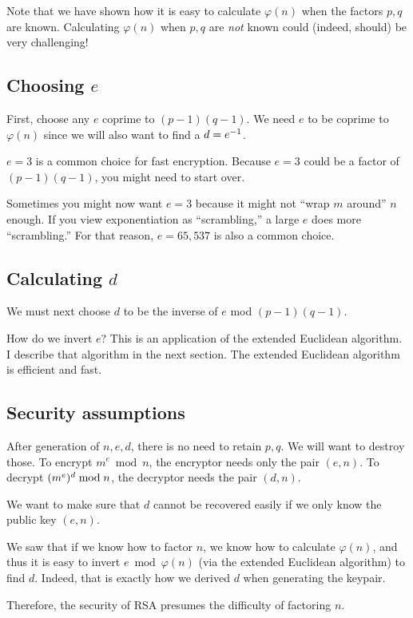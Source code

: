 \begin{remark}
  Note that we have shown how it is easy to calculate $\varphi(n)$ when
  the factors $p, q$ are known. Calculating $\varphi(n)$ when $p, q$ are
  \emph{not} known could (indeed, should) be very challenging!
\end{remark}

\subsection{Choosing $e$}

First, choose any $e$ coprime to $(p - 1) (q - 1)$. We need $e$ to be
coprime to $\varphi(n)$ since we will also want to find a $d = {e}^{-1}$.

$e = 3$ is a common choice for fast encryption. Because $e = 3$ could be
a factor of $(p - 1)(q - 1)$, you might need to start over.

Sometimes you might now want $e = 3$ because it might not ``wrap $m$
around'' $n$ enough. If you view exponentiation as ``scrambling,'' a
large $e$ does more ``scrambling.'' For that reason, $e = 65,537$ is
also a common choice.

\subsection{Calculating $d$}

We must next choose $d$ to be the inverse of $e$ mod $(p - 1) (q - 1)$.

How do we invert $e$? This is an application of the extended Euclidean
algorithm. I describe that algorithm in the next section. The extended
Euclidean algorithm is efficient and fast.

\subsection{Security assumptions}

\begin{remark}
  After generation of $n, e, d$, there is no need to retain $p, q$. We
  will want to destroy those. To encrypt $m^e \bmod n$, the encryptor
  needs only the pair $(e, n)$. To decrypt $\mathopen{}\left( {m^e} \right)\mathclose{}^d \bmod n$, the
  decryptor needs the pair $(d, n)$.
\end{remark}

\begin{remark}
  We want to make sure that $d$ cannot be recovered easily if we only
  know the public key $(e, n)$.

  We saw that if we know how to factor $n$, we know how to calculate
  $\varphi(n)$, and thus it is easy to invert $e \bmod \varphi(n)$ (via
  the extended Euclidean algorithm) to find $d$. Indeed, that is exactly
  how we derived $d$ when generating the keypair.

  Therefore, the security of RSA presumes the difficulty of factoring
  $n$.
\end{remark}

